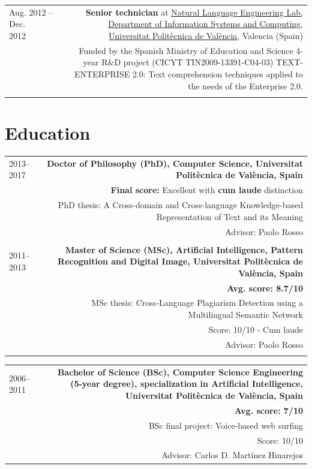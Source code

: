 \documentclass[10pt]{article}
\begin{document}
\begin{tabular}{L!{\VRule}R}
Aug. 2012 -- Dec. 2012~~~~&{\textbf{Senior technician} at \href{http://users.dsic.upv.es/grupos/nle/}{Natural Language Engineering Lab, Department of Information Systems and Computing, Universitat Polit{\`e}cnica de Val{\`e}ncia}, Valencia (Spain)}\\
&\scriptsize{Funded by the Spanish Ministry of Education and Science 4-year R\&D project (CICYT TIN2009-13391-C04-03) TEXT-ENTERPRISE 2.0: Text comprehension techniques
applied to the needs of the Enterprise 2.0.}\\&\\
\end{tabular}

\section*{Education}
\begin{tabular}{L!{\VRule}R}
	2013--2017 &{\bf Doctor of Philosophy (PhD), Computer Science, Universitat Polit{\`e}cnica de Val{\`e}ncia, Spain}\vspace{5pt}\\
	&\textbf{Final score:} Excellent  with \textbf{cum laude} distinction\\
	&\scriptsize{PhD thesis: A Cross-domain and Cross-language Knowledge-based Representation of Text and its Meaning}\\
	&\scriptsize{Advisor: Paolo Rosso}\\
	&\\
	2011--2013&{\bf Master of Science (MSc), Artificial Intelligence, Pattern Recognition and Digital Image, Universitat Polit{\`e}cnica de Val{\`e}ncia, Spain}\vspace{5pt}\\
	&\bf Avg. score: 8.7/10\\
	&\scriptsize{MSc thesis: Cross-Language Plagiarism Detection using a Multilingual Semantic Network}\\
	&\scriptsize{Score: 10/10  -  Cum laude}\\
	&\scriptsize{Advisor: Paolo Rosso}\\
	&\\
\end{tabular}

\begin{tabular}{L!{\VRule}R}
	2006--2011& \bf Bachelor of Science (BSc), Computer Science Engineering (5-year degree), specialization in Artificial Intelligence, Universitat Polit{\`e}cnica de Val{\`e}ncia, Spain\vspace{5pt}\\
	&\bf Avg. score: 7/10\\
	&\scriptsize{BSc final project: Voice-based web surfing}\\
	&\scriptsize{Score: 10/10}\\
	&\scriptsize{Advisor: Carlos D. Mart\'inez Hinarejos}\\ 
\end{tabular}
\end{document}
